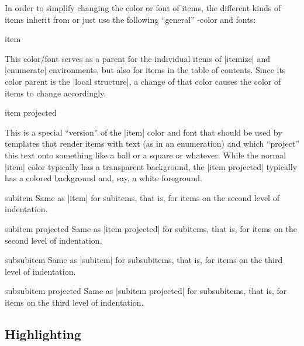 In order to simplify changing the color or font of items, the different kinds of items inherit from or just use the following ``general'' \beamer-color and fonts:

\begin{element}{item}\no\yes\yes

  This color/font serves as a parent for the individual items of |itemize| and |enumerate| environments, but also for items in the table of contents. Since its color parent is the |local structure|, a change of that color causes the color of items to change accordingly.
\end{element}

\begin{element}{item projected}\no\yes\yes

  This is a special ``version'' of the |item| color and font that should be used by templates that render items with text (as in an enumeration) and which ``project'' this text onto something like a ball or a square or whatever. While the normal |item| color typically has a transparent background, the |item projected| typically has a colored background and, say, a white foreground.
\end{element}

\begin{element}{subitem}\no\yes\yes
  Same as |item| for subitems, that is, for items on the second level of indentation.
\end{element}

\begin{element}{subitem projected}\no\yes\yes
  Same as |item projected| for subitems, that is, for items on the second level of indentation.
\end{element}

\begin{element}{subsubitem}\no\yes\yes
  Same as |subitem| for subsubitems, that is, for items on the third level of indentation.
\end{element}

\begin{element}{subsubitem projected}\no\yes\yes
  Same as |subitem projected| for subsubitems, that is, for items on the third level of indentation.
\end{element}


\subsection{Highlighting}

